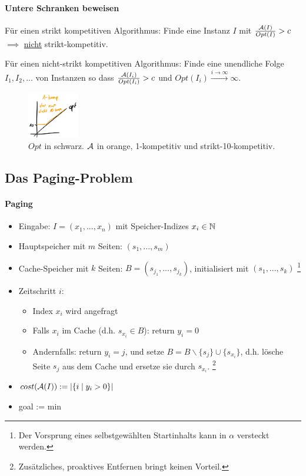 \paragraph{Untere Schranken beweisen}
Für einen strikt kompetitiven Algorithmus:
Finde eine Instanz $I$ mit $\frac{\mathcal{A}(I)}{Opt(I)} > c$ $\implies$ \underline{nicht} strikt-kompetitiv.

Für einen nicht-strikt kompetitiven Algorithmus:
Finde eine unendliche Folge $I_1, I_2, ...$ von Instanzen so dass $\frac{\mathcal{A}(I_i)}{Opt(I_i)} > c$
und $Opt(I_i) \overset{i \rightarrow \infty}{\longrightarrow} \infty $.

\begin{figure}[h]
    \centering
    \includegraphics[width=0.2\textwidth]{images/strikt-kompetitiv.png}
    \caption{$Opt$ in schwarz. $\mathcal{A}$ in orange, 1-kompetitiv und strikt-10-kompetitiv.}
\end{figure}


\subsection{Das Paging-Problem}

\paragraph{Paging}
\begin{itemize}
    \item Eingabe: $ I = (x_1, ..., x_n)$ mit Speicher-Indizes $x_i \in \mathbb{N}$
    \item Hauptspeicher mit $m$ Seiten: $ (s_1, ..., s_m) $
    \item Cache-Speicher mit $k$ Seiten: $ B = (s_{j_1}, ..., s_{j_k}) $, initialisiert mit $ (s_1, ..., s_k) $
        \footnote{Der Vorsprung eines selbstgewählten Startinhalts kann in $\alpha$ versteckt werden.}
    \item Zeitschritt $i$:
    \begin{itemize}
        \item Index $x_i$ wird angefragt
        \item Falls $x_i$ im Cache (d.h. $s_{x_i} \in B$): return $y_i=0$
        \item Andernfalls: return $y_i=j$, und setze $B = B \backslash  \{s_j\} \cup \{s_{x_i}\} $,
            d.h. lösche Seite $s_j$ aus dem Cache und ersetze sie durch $s_{x_i}$.
            \footnote{Zusätzliches, proaktives Entfernen bringt keinen Vorteil.}
    \end{itemize}
    \item $ cost(\mathcal{A}(I)) := \vert \{ i \; | \; y_i > 0 \} \vert $
    \item goal := min
\end{itemize}

